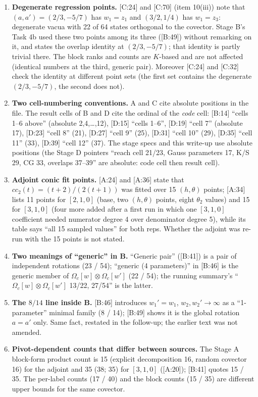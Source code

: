 \documentclass[10pt]{article}
\newcommand{\cl}[2]{\textsf{[#1:#2]}}
\newcommand{\Om}{\Omega}
\begin{document}
\begin{enumerate}
\item \textbf{Degenerate regression points.} \cl{C}{24} and \cl{C}{70} (item 10(iii)) note that $(a,a')=(2/3,-5/7)$ has $w_1=z_1$ and $(3/2,1/4)$ has $w_1=z_3$: degenerate vacua with 22 of 64 states orthogonal to the covector. Stage B's Task 4b used these two points among its three (\cl{B}{49}) without remarking on it, and states the overlap identity at $(2/3,-5/7)$; that identity is partly trivial there. The block ranks and counts are $K$-based and are not affected (identical numbers at the third, generic pair). Moreover \cl{C}{24} and \cl{C}{32} check the identity at different point sets (the first set contains the degenerate $(2/3,-5/7)$, the second does not).
\item \textbf{Two cell-numbering conventions.} A and C cite absolute positions in the file. The result cells of B and D cite the ordinal of the \emph{code} cell: \cl{B}{14} ``cells 1--6 above'' (absolute 2,4,\dots,12), \cl{D}{15} ``cells 1--6'', \cl{D}{19} ``cell 7'' (absolute 17), \cl{D}{23} ``cell 8'' (21), \cl{D}{27} ``cell 9'' (25), \cl{D}{31} ``cell 10'' (29), \cl{D}{35} ``cell 11'' (33), \cl{D}{39} ``cell 12'' (37). The stage specs and this write-up use absolute positions (the Stage D pointers ``reach cell 21/23, Gauss parameters 17, K/S 29, CG 33, overlaps 37--39'' are absolute: code cell then result cell).
\item \textbf{Adjoint conic fit points.} \cl{A}{24} and \cl{A}{36} state that $cc_2(t)=(t+2)/(2(t+1))$ was fitted over 15 $(h,\theta)$ points; \cl{A}{34} lists 11 points for $[2,1,0]$ (base, two $(h,\theta)$ points, eight $\theta_2$ values) and 15 for $[3,1,0]$ (four more added after a first run in which one $[3,1,0]$ coefficient needed numerator degree 4 over denominator degree 5), while its table says ``all 15 sampled values'' for both reps. Whether the adjoint was re-run with the 15 points is not stated.
\item \textbf{Two meanings of ``generic'' in B.} ``Generic pair'' (\cl{B}{41}) is a pair of independent rotations (23 / 54); ``generic (4 parameters)'' in \cl{B}{46} is the generic member of $\Om_c[w]\otimes\Om_c[w']$ (22 / 54); the running summary's ``$\Om_c[w]\otimes\Om_c[w']$ 13/22, 27/54'' is the latter.
\item \textbf{The $8/14$ line inside B.} \cl{B}{46} introduces $w_1'=w_1$, $w_2,w_2'\to\infty$ as a ``1-parameter'' minimal family (8 / 14); \cl{B}{49} shows it is the global rotation $a=a'$ only. Same fact, restated in the follow-up; the earlier text was not amended.
\item \textbf{Pivot-dependent counts that differ between sources.} The Stage A block-form product count is 15 (explicit decomposition 16, random covector 16) for the adjoint and 35 (38; 35) for $[3,1,0]$ (\cl{A}{20}); \cl{B}{41} quotes 15 / 35. The per-label counts (17 / 40) and the block counts (15 / 35) are different upper bounds for the same covector.

\end{enumerate}
\end{document}
